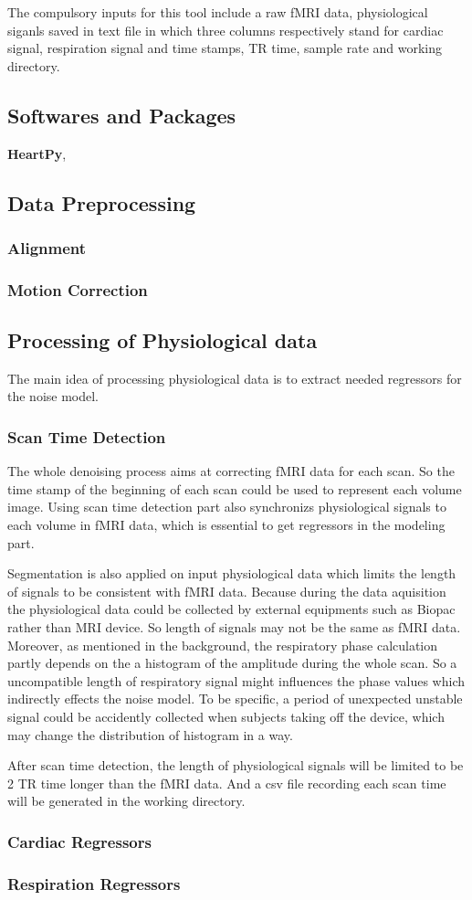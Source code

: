The compulsory inputs for this tool include a raw fMRI data, 
physiological siganls saved in text file in which three columns respectively stand for cardiac signal, 
respiration signal and time stamps,
TR time, sample rate and working directory.

\subsection{Softwares and Packages}
\textbf{HeartPy}\cite{van2019heartpy},

\subsection{Data Preprocessing}
\subsubsection{Alignment}
\subsubsection{Motion Correction}

\subsection{Processing of Physiological data}
The main idea of processing physiological data is to extract needed regressors for the noise model.

\subsubsection{Scan Time Detection}
The whole denoising process aims at correcting fMRI data for each scan. 
So the time stamp of the beginning of each scan could be used to represent each volume image. 
Using scan time detection part also synchronizs physiological signals to each volume in fMRI data,
which is essential to get regressors in the modeling part.

Segmentation is also applied on input physiological data which
limits the length of signals to be consistent with fMRI data. Because during the data aquisition the physiological
data could be collected by external equipments such as Biopac rather than MRI device.
So length of signals may not be the same as fMRI data. Moreover, as mentioned in the background, the respiratory phase calculation 
partly depends on the a histogram of the amplitude during the whole scan. So a uncompatible length of 
respiratory signal might influences the phase values which indirectly effects the noise model. To be specific, 
a period of unexpected unstable signal could be accidently collected when subjects taking off the 
device, which may change the distribution of histogram in a way.

After scan time detection, the length of physiological signals will be limited to be 2 TR time longer than the 
fMRI data. And a csv file recording each scan time will be generated in the working directory.

\subsubsection{Cardiac Regressors}



\subsubsection{Respiration Regressors}

